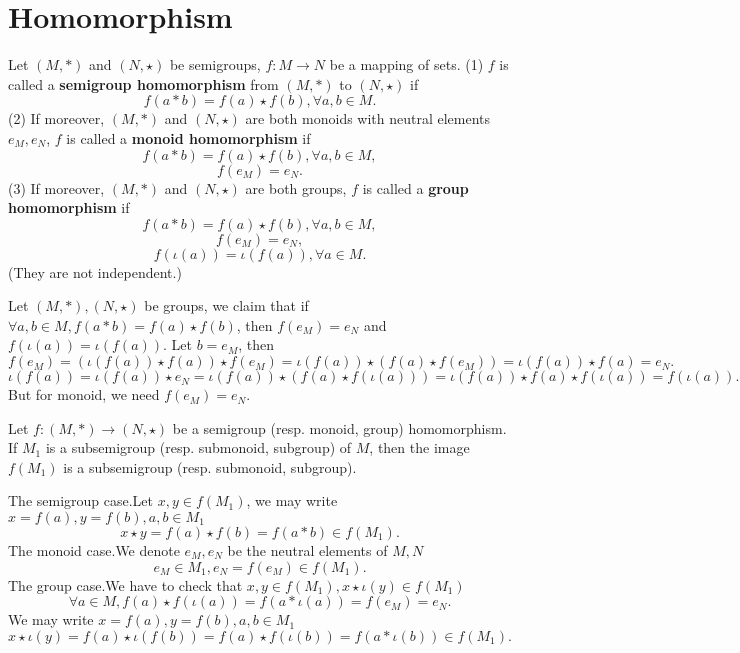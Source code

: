 \section{Homomorphism}
\begin{definitionenv}
    Let $(M, *)$ and $(N, \star)$ be  semigroups,  $f:M\rightarrow N$ be a mapping of sets.
    \newline
    (1) $f$ is called a \textbf{semigroup homomorphism} from $(M, *)$ to $(N, \star)$ if
    $$f(a*b)=f(a)\star f(b), \forall a, b\in M.$$
    (2) If moreover,  $(M, *)$ and $(N, \star)$ are both monoids with neutral elements $e_M, e_N$,  $f$ is called a \textbf{monoid homomorphism} if 
     $$f(a*b)=f(a)\star f(b), \forall a, b\in M, $$ 
     $$f(e_M)=e_N.$$
    (3) If moreover,  $(M, *)$ and $(N, \star)$ are both groups,  $f$ is called a \textbf{group homomorphism} if 
    $$f(a*b)=f(a)\star f(b), \forall a, b\in M, $$
    $$f(e_M)=e_N, $$
    $$f(\iota(a))=\iota(f(a)), \forall a\in M.$$
    (They are not independent.)
\end{definitionenv}
\begin{remark}
    Let $(M,*),(N,\star)$ be groups, we claim that if $\forall a,b\in M,f(a*b)=f(a)\star f(b)$, then $f(e_M)=e_N$ and $f(\iota(a))=\iota(f(a))$. 
    Let $b=e_M$, then 
    {\small$$ f(e_M)=\left(\iota(f(a))\star f(a)\right)\star f(e_M)=\iota(f(a))\star\left( f(a)\star f(e_M)\right)=\iota(f(a))\star f(a)=e_N.$$
    $$\iota(f(a))=\iota(f(a))\star e_N=\iota(f(a))\star\left(f(a)\star f(\iota(a))\right)=\iota(f(a))\star f(a)\star f(\iota(a))=f(\iota(a)).$$}
    But for monoid,  we need $f(e_M)=e_N$.
\end{remark}
\begin{propositionenv}
    \quad 
    \newline
    Let $f:(M, *)\rightarrow (N, \star)$ be a semigroup (resp. monoid, group) homomorphism. If $M_1$ is a subsemigroup (resp. submonoid, subgroup) of $M$,  then the image $f(M_1)$ is a subsemigroup (resp. submonoid, subgroup).
\end{propositionenv}
\begin{proofenv}
    The semigroup case.Let $x, y\in f(M_1)$,  we may write $x=f(a), y=f(b), a, b\in M_1$
    $$x\star y=f(a)\star f(b)=f(a*b)\in f(M_1).$$
    The monoid case.We denote $e_M, e_N$ be the neutral elements of $M, N$
    $$e_M\in M_1, e_N=f(e_M)\in f(M_1).$$
    The group case.We have to check that $x, y\in f(M_1), x\star \iota(y)\in f(M_1)$
    $$\forall a\in M,  f(a)\star f(\iota(a))=f(a*\iota(a))=f(e_M)=e_N.$$
    We may write $x=f(a), y=f(b), a, b\in M_1$
    $$x\star \iota(y)=f(a)\star\iota(f(b))=f(a)\star f(\iota(b))=f(a*\iota(b))\in f(M_1).$$
\end{proofenv}
